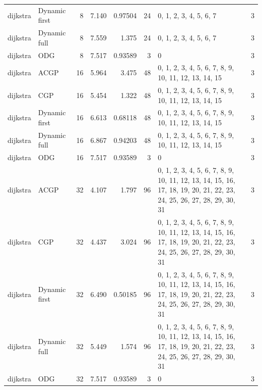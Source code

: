 \documentclass[10pt,a4paper]{article}
\begin{document}
\begin{longtable}{@{}p{23mm}p{29mm}rrrrp{36mm}r@{}}
dijkstra & Dynamic first & 8 & 7.140 & 0.97504 & 24 & 0, 1, 2, 3, 4, 5, 6, 7 & 3 \\
dijkstra & Dynamic full & 8 & 7.559 & 1.375 & 24 & 0, 1, 2, 3, 4, 5, 6, 7 & 3 \\
dijkstra & ODG & 8 & 7.517 & 0.93589 & 3 & 0 & 3 \\
dijkstra & ACGP & 16 & 5.964 & 3.475 & 48 & 0, 1, 2, 3, 4, 5, 6, 7, 8, 9, 10, 11, 12, 13, 14, 15 & 3 \\
dijkstra & CGP & 16 & 5.454 & 1.322 & 48 & 0, 1, 2, 3, 4, 5, 6, 7, 8, 9, 10, 11, 12, 13, 14, 15 & 3 \\
dijkstra & Dynamic first & 16 & 6.613 & 0.68118 & 48 & 0, 1, 2, 3, 4, 5, 6, 7, 8, 9, 10, 11, 12, 13, 14, 15 & 3 \\
dijkstra & Dynamic full & 16 & 6.867 & 0.94203 & 48 & 0, 1, 2, 3, 4, 5, 6, 7, 8, 9, 10, 11, 12, 13, 14, 15 & 3 \\
dijkstra & ODG & 16 & 7.517 & 0.93589 & 3 & 0 & 3 \\
dijkstra & ACGP & 32 & 4.107 & 1.797 & 96 & 0, 1, 2, 3, 4, 5, 6, 7, 8, 9, 10, 11, 12, 13, 14, 15, 16, 17, 18, 19, 20, 21, 22, 23, 24, 25, 26, 27, 28, 29, 30, 31 & 3 \\
dijkstra & CGP & 32 & 4.437 & 3.024 & 96 & 0, 1, 2, 3, 4, 5, 6, 7, 8, 9, 10, 11, 12, 13, 14, 15, 16, 17, 18, 19, 20, 21, 22, 23, 24, 25, 26, 27, 28, 29, 30, 31 & 3 \\
dijkstra & Dynamic first & 32 & 6.490 & 0.50185 & 96 & 0, 1, 2, 3, 4, 5, 6, 7, 8, 9, 10, 11, 12, 13, 14, 15, 16, 17, 18, 19, 20, 21, 22, 23, 24, 25, 26, 27, 28, 29, 30, 31 & 3 \\
dijkstra & Dynamic full & 32 & 5.449 & 1.574 & 96 & 0, 1, 2, 3, 4, 5, 6, 7, 8, 9, 10, 11, 12, 13, 14, 15, 16, 17, 18, 19, 20, 21, 22, 23, 24, 25, 26, 27, 28, 29, 30, 31 & 3 \\
dijkstra & ODG & 32 & 7.517 & 0.93589 & 3 & 0 & 3 \\
\end{longtable}\normalsize\setlength{\tabcolsep}{6pt}
\clearpage
\end{document}
